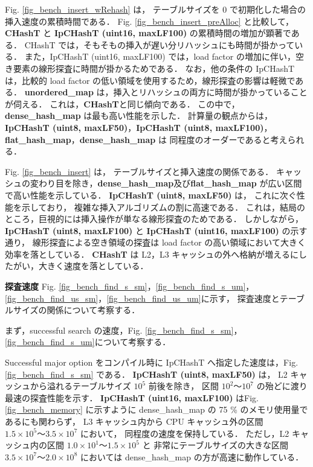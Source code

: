 Fig. \ref{fig_bench_insert_wRehash} は，
テーブルサイズを 0 で初期化した場合の挿入速度の累積時間である．
Fig. \ref{fig_bench_insert_preAlloc} と比較して，
{\bf CHashT} と {\bf IpCHashT (uint16, maxLF100)} の累積時間の増加が顕著である．
CHashT では，そもそもの挿入が遅い分リハッシュにも時間が掛かっている．
また，IpCHashT (uint16, maxLF100) では，load factor の増加に伴い，空き要素の線形探査に時間が掛かるためである．
なお，他の条件の IpCHashT は，比較的 load factor の低い領域を使用するため，線形探査の影響は軽微である．
{\bf unordered\_map} は，挿入とリハッシュの両方に時間が掛かっていることが伺える．
これは，{\bf CHashT}と同じ傾向である．
この中で，{\bf dense\_hash\_map} は最も高い性能を示した．
計算量の観点からは，
{\bf IpCHashT (uint8, maxLF50)}，{\bf IpCHashT (uint8, maxLF100)}，{\bf flat\_hash\_map}，{\bf dense\_hash\_map} は
同程度のオーダーであると考えられる．

Fig. \ref{fig_bench_insert} は，
テーブルサイズと挿入速度の関係である．
キャッシュの変わり目を除き，{\bf dense\_hash\_map}及び{\bf flat\_hash\_map} が広い区間で高い性能を示している．
{\bf IpCHashT (uint8, maxLF50)} は，
これに次ぐ性能を示しており，
複雑な挿入アルゴリズムの割に高速である．
これは，結局のところ，巨視的には挿入操作が単なる線形探査のためである．
しかしながら，{\bf IpCHashT (uint8, maxLF100)} と {\bf IpCHashT (uint16, maxLF100)} の示す通り，
線形探査による空き領域の探査は load factor の高い領域において大きく効率を落としている．
{\bf CHashT} は L2，L3 キャッシュの外へ格納が増えるにしたがい，大きく速度を落としている．
\leavevmode \newline

%
{\bf 探査速度}
\samepage\newline\indent
Fig. 
\ref{fig_bench_find_s_sm}，\ref{fig_bench_find_s_um}，
\ref{fig_bench_find_us_sm}，\ref{fig_bench_find_us_um}に示す，
探査速度とテーブルサイズの関係について考察する．

まず，successful search の速度，Fig. \ref{fig_bench_find_s_sm}，\ref{fig_bench_find_s_um}について考察する．

Successful major option をコンパイル時に IpCHashT へ指定した速度は，Fig. \ref{fig_bench_find_s_sm} である．
{\bf IpCHashT (uint8, maxLF50)} は，
L2 キャッシュから溢れるテーブルサイズ $10^5$ 前後を除き，
区間 $10^2〜10^7$ の殆どに渡り最速の探査性能を示す．
{\bf IpCHashT (uint16, maxLF100)} はFig. \ref{fig_bench_memory} に示すように
dense\_hash\_map の 75 \% のメモリ使用量であるにも関わらず，
L3 キャッシュ内から CPU キャッシュ外の区間 $1.5\times10^5〜3.5\times10^7$ において，
同程度の速度を保持している．
ただし，L2 キャッシュ内の区間 $1.0\times10^1〜1.5\times10^5$ と
非常にテーブルサイズの大きな区間 $3.5\times10^7〜2.0\times10^8$ においては
dense\_hash\_map の方が高速に動作している．


